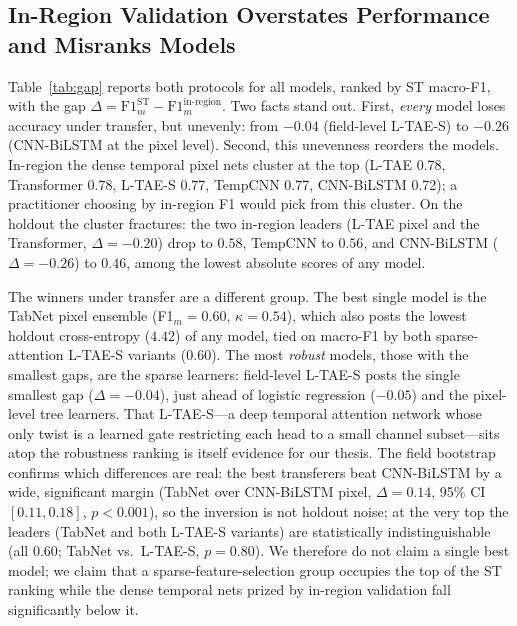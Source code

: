 \documentclass[preprint,authoryear]{elsarticle}
\begin{document}
\subsection{In-Region Validation Overstates Performance and Misranks Models}
Table~\ref{tab:gap} reports both protocols for all models, ranked by ST macro-F1, with the gap $\Delta=\text{F1}_m^{\text{ST}}-\text{F1}_m^{\text{in-region}}$. Two facts stand out. First, \emph{every} model loses accuracy under transfer, but unevenly: from $-0.04$ (field-level L-TAE-S) to $-0.26$ (CNN-BiLSTM at the pixel level). Second, this unevenness reorders the models. In-region the dense temporal pixel nets cluster at the top (L-TAE 0.78, Transformer 0.78, L-TAE-S 0.77, TempCNN 0.77, CNN-BiLSTM 0.72); a practitioner choosing by in-region F1 would pick from this cluster. On the holdout the cluster fractures: the two in-region leaders (L-TAE pixel and the Transformer, $\Delta=-0.20$) drop to $0.58$, TempCNN to $0.56$, and CNN-BiLSTM ($\Delta=-0.26$) to $0.46$, among the lowest absolute scores of any model.

The winners under transfer are a different group. The best single model is the TabNet pixel ensemble (F1$_m=0.60$, $\kappa=0.54$), which also posts the lowest holdout cross-entropy ($4.42$) of any model, tied on macro-F1 by both sparse-attention L-TAE-S variants ($0.60$). The most \emph{robust} models, those with the smallest gaps, are the sparse learners: field-level L-TAE-S posts the single smallest gap ($\Delta=-0.04$), just ahead of logistic regression ($-0.05$) and the pixel-level tree learners. That L-TAE-S---a deep temporal attention network whose only twist is a learned gate restricting each head to a small channel subset---sits atop the robustness ranking is itself evidence for our thesis. The field bootstrap confirms which differences are real: the best transferers beat CNN-BiLSTM by a wide, significant margin (TabNet over CNN-BiLSTM pixel, $\Delta=0.14$, 95\% CI $[0.11,0.18]$, $p<0.001$), so the inversion is not holdout noise; at the very top the leaders (TabNet and both L-TAE-S variants) are statistically indistinguishable (all $0.60$; TabNet vs.\ L-TAE-S, $p=0.80$). We therefore do not claim a single best model; we claim that a sparse-feature-selection group occupies the top of the ST ranking while the dense temporal nets prized by in-region validation fall significantly below it.
\end{document}
